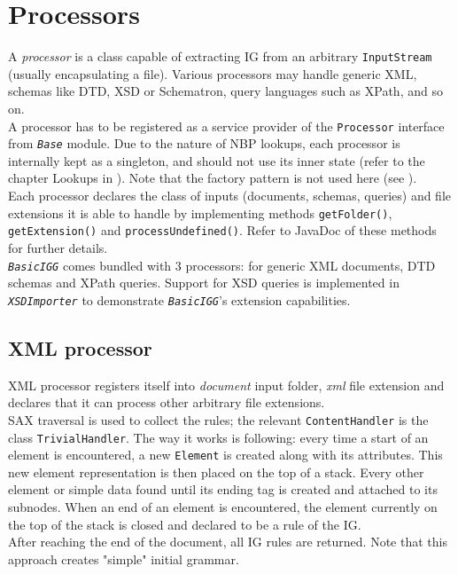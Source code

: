 \documentclass[a4paper,10pt,oneside]{article}
\newcommand{\code}[1]{\texttt{#1}}
\newcommand{\jmodule}[1]{\texttt{\textit{#1}}}
\begin{document}
\section{Processors}

A \emph{processor} is a class capable of extracting IG from an arbitrary \code{InputStream} (usually encapsulating a file). Various processors may handle generic XML, schemas like DTD, XSD or Schematron, query languages such as XPath, and so on.\\
A processor has to be registered as a service provider of the \code{Processor} interface from \jmodule{Base} module. Due to the nature of NBP lookups, each processor is internally kept as a singleton, and should not use its inner state (refer to the chapter Lookups in \cite{archdoc}). Note that the factory pattern is not used here (see \cite[Factory]{archdoc}).\\ %
Each processor declares the class of inputs (documents, schemas, queries) and file extensions it is able to handle by implementing methods \code{getFolder()}, \code{getExtension()} and \code{processUndefined()}. Refer to JavaDoc of these methods for further details.\\

\jmodule{BasicIGG} comes bundled with 3 processors: for generic XML documents, DTD schemas and XPath queries. Support for XSD queries is implemented in \jmodule{XSDImporter} to demonstrate \jmodule{BasicIGG}'s extension capabilities.

\subsection{XML processor}

XML processor registers itself into \emph{document} input folder, \emph{xml} file extension and declares that it can process other arbitrary file extensions.\\
SAX traversal is used to collect the rules; the relevant \code{ContentHandler} is the class \code{TrivialHandler}. The way it works is following: every time a start of an element is encountered, a new \code{Element} is created along with its attributes. This new element representation is then placed on the top of a stack. Every other element or simple data found until its ending tag is created and attached to its subnodes. When an end of an element is encountered, the element currently on the top of the stack is closed and declared to be a rule of the IG.\\
After reaching the end of the document, all IG rules are returned. Note that this approach creates "simple" initial grammar.
\end{document}
